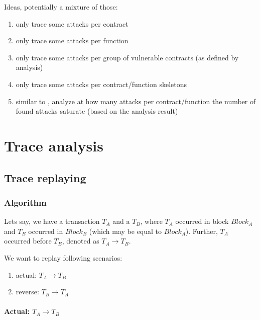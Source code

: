 \documentclass[draft,final]{vutinfth} %
\begin{document}
    Ideas, potentially a mixture of those:

    \begin{enumerate}
        \item only trace some attacks per contract
        \item only trace some attacks per function
        \item only trace some attacks per group of vulnerable contracts (as defined by analysis)
        \item only trace some attacks per contract/function skeletons
        \item similar to \cite{}, analyze at how many attacks per contract/function the number of found attacks saturate (based on the analysis result)
    \end{enumerate}
\fi

\chapter{Trace analysis}


\section{Trace replaying}

\subsection{Algorithm}

Lets say, we have a transaction $T_A$ and a $T_B$, where $T_A$ occurred in block $Block_A$ and $T_B$ occurred in $Block_B$ (which may be equal to $Block_A$). Further, $T_A$ occurred before $T_B$, denoted as $T_A \rightarrow T_B$.

We want to replay following scenarios:

\begin{enumerate}
    \item actual: $T_A \rightarrow T_B$
    \item reverse: $T_B \rightarrow T_A$
\end{enumerate}

\subsubsection{Actual: $T_A \rightarrow T_B$}
\end{document}
